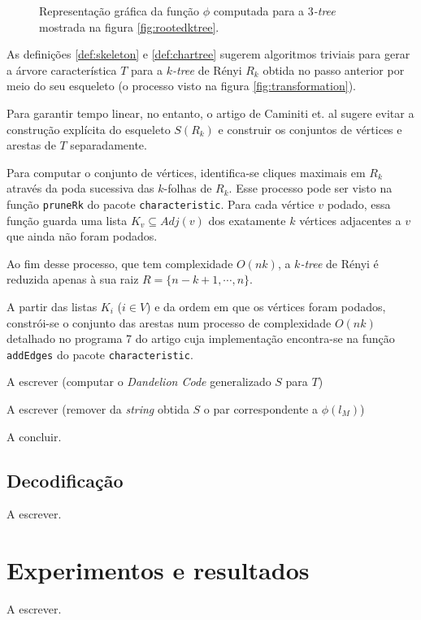 \begin{algorithm}
\begin{step}
\begin{figure}
      \caption{Representação gráfica da função $\phi$ computada para a \emph{$3$-tree} mostrada na figura \ref{fig:rootedktree}.}
      \label{fig:phi}
    \end{figure}
  \end{step}

  \begin{step}
    As definições \ref{def:skeleton} e \ref{def:chartree} sugerem algoritmos triviais para gerar a árvore característica $T$ para a \emph{$k$-tree} de Rényi $R_k$ obtida no passo anterior por meio do seu esqueleto (o processo visto na figura \ref{fig:transformation}).

    Para garantir tempo linear, no entanto, o artigo de Caminiti et. al \cite{caminiti} sugere evitar a construção explícita do esqueleto $S(R_k)$ e construir os conjuntos de vértices e arestas de $T$ separadamente.

    Para computar o conjunto de vértices, identifica-se cliques maximais em $R_k$ através da poda sucessiva das $k$-folhas de $R_k$. Esse processo pode ser visto na função {\tt pruneRk} do pacote {\tt characteristic}. Para cada vértice $v$ podado, essa função guarda uma lista $K_v \subseteq Adj(v)$ dos exatamente $k$ vértices adjacentes a $v$ que ainda não foram podados.

    Ao fim desse processo, que tem complexidade $O(nk)$, a \emph{$k$-tree} de Rényi é reduzida apenas à sua raiz $R = \{n-k+1, \cdots, n\}$.

    A partir das listas $K_i$ ($i \in V$) e da ordem em que os vértices foram podados, constrói-se o conjunto das arestas num processo de complexidade $O(nk)$ detalhado no programa 7 do artigo \cite{caminiti} cuja implementação encontra-se na função {\tt addEdges} do pacote {\tt characteristic}.
  \end{step}

  \begin{step}
    A escrever (computar o \emph{Dandelion Code} generalizado $S$ para $T$) %
  \end{step}

  \begin{step}
    A escrever (remover da \emph{string} obtida $S$ o par correspondente a $\phi(l_M)$) %
  \end{step}

  A concluir. %
\end{algorithm}

\subsection{Decodificação}

A escrever. %

\section{Experimentos e resultados}

A escrever. %


